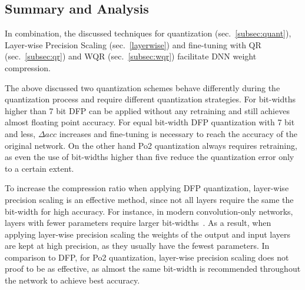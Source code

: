 

\subsection{Summary and Analysis}
In combination, the discussed techniques for quantization (sec.~\ref{subsec:quant}), Layer-wise Precision Scaling (sec.~\ref{layerwise}) and fine-tuning with QR (sec.~\ref{subsec:qr}) and WQR (sec.~\ref{subsec:wqr}) facilitate DNN weight compression.

The above discussed two quantization schemes behave differently during the quantization process and require different quantization strategies. For bit-widths higher than 7 bit DFP can be applied without any retraining and still achieves almost floating point accuracy. For equal bit-width DFP quantization with 7 bit and less, $\Delta acc$ increases and fine-tuning is necessary to reach the accuracy of the original network. On the other hand Po2 quantization always requires retraining, as even the use of bit-widths higher than five reduce the quantization error only to a certain extent.

To increase the compression ratio when applying DFP quantization, layer-wise precision scaling is an effective method, since not all layers require the same the bit-width for high accuracy. For instance, in modern convolution-only networks, layers with fewer parameters require larger bit-widths~\cite{Lin2015a}. As a result, when applying layer-wise precision scaling the weights of the output and input layers are kept at high precision, as they usually have the fewest parameters.
In comparison to DFP, for Po2 quantization, layer-wise precision scaling does not proof to be as effective, as almost the same bit-width is recommended throughout the network to achieve best accuracy.

